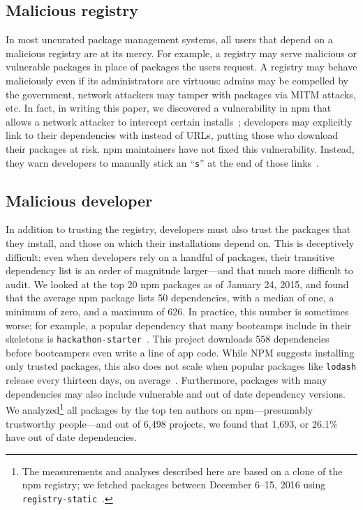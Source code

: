 \subsection{Malicious registry}
In most uncurated package management systems, all users that depend on a
malicious registry are at its mercy. For example, a registry may serve
malicious or vulnerable packages in place of packages the users request. A
registry may behave maliciously even if its administrators are virtuous: admins
may be compelled by the government, network attackers may tamper with packages
via MITM attacks, etc. In fact, in writing this paper, we discovered a
vulnerability in npm that allows a network attacker to intercept certain
installs~\cite{shrink}; developers may explicitly link to their dependencies
with \http instead of \https URLs, putting those who download their packages at
risk. npm maintainers have not fixed this vulnerability. Instead, they warn
developers to manually stick an ``\texttt{s}'' at the end of those
links~\cite{shrink-response}.

\subsection{Malicious developer} %
In addition to trusting the registry, developers must also trust the packages
that they install, and those on which their installations depend on. This is
deceptively difficult: even when developers rely on a handful of packages,
their transitive dependency list is an order of magnitude larger---and that
much more difficult to audit. We looked at the top 20 npm packages as of
January 24, 2015, and found that the average npm package lists 50 dependencies,
with a median of one, a minimum of zero, and a maximum of 626. In practice,
this number is sometimes worse; for example, a popular dependency that many
bootcamps include in their skeletons is
\texttt{hackathon-starter}~\cite{hackathon-starter}. This project downloads 558
dependencies before bootcampers even write a line of app code. While NPM
suggests installing only trusted packages, this also does not scale when
popular packages like \texttt{lodash} release every thirteen days, on
average~\cite{npm-package-install, staicu2016understanding}. Furthermore,
packages with many dependencies may also include vulnerable and out of date
dependency versions. We analyzed\footnote{ The measurements and analyses
described here are based on a clone of the npm registry; we fetched packages
between December 6--15, 2016 using
\texttt{registry-static}~\cite{registry-static}.} all packages by the top ten
authors on npm---presumably trustworthy people---and out of 6,498 projects, we
found that 1,693, or 26.1\% have out of date dependencies.

